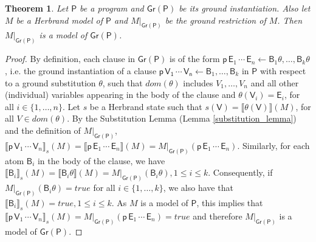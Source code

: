 \documentclass[submission,copyright]{eptcs}
\newtheorem{theorem}{Theorem}
\theoremstyle{definition}
\newcommand{\mwrt}[2]{\llbracket#1\rrbracket(#2)}
\newcommand{\mwrs}[3]{\llbracket#1\rrbracket_{#3}(#2)}
\begin{document}
\begin{theorem}
\label{th_ground_model}
Let $\mathsf{P}$ be a program and $\mathsf{Gr(P)}$ be its ground instantiation.
Also let $M$ be a Herbrand model of $\mathsf{P}$ and $M|_{\mathsf{Gr(P)}}$ be the ground restriction of $M$. Then $M|_\mathsf{Gr(P)}$ is a model of $\mathsf{Gr(P)}$.
\end{theorem}
\begin{proof}
By definition, each clause in $\mathsf{Gr(P)}$ is of the form
$\mathsf{p} \, \mathsf{E}_1 \, \cdots \, \mathsf{E}_n \leftarrow \mathsf{B}_1\theta, \ldots, \mathsf{B}_k\theta$, i.e. the ground instantiation of a clause $\mathsf{p \, V_1 \, \cdots \, V_n} \leftarrow \mathsf{B}_1, \ldots, \mathsf{B}_k$ in $\mathsf{P}$ with respect to a ground substitution $\theta$, such that $dom(\theta)$ includes $V_1,\ldots,V_n$ and all other (individual) variables appearing in the body of the clause and $\theta(\mathsf{V}_i) = \mathsf{E}_i$, for all $i \in \{1, \ldots, n\}$.
Let $s$ be a Herbrand state such that $s(\mathsf{V}) =\mwrt{\theta(\mathsf{V})}{M}$,
for all $V \in dom(\theta)$. By the Substitution Lemma (Lemma \ref{substitution_lemma})
and the definition of $M|_\mathsf{Gr(P)}$,
$\mwrs{\mathsf{p}\, \mathsf{V}_1\, \cdots\, \mathsf{V}_n}{M}{s} =
 \mwrt{\mathsf{p}\, \mathsf{E}_1\, \cdots\, \mathsf{E}_n}{M} =
 M|_\mathsf{Gr(P)}(\mathsf{p}\, \mathsf{E}_1\, \cdots\, \mathsf{E}_n)$.
Similarly, for each atom $\mathsf{B}_i$ in the body of the clause,
we have $\mwrs{\mathsf{B}_i}{M}{s} = \mwrt{\mathsf{B}_i\theta}{M}
= M|_\mathsf{Gr(P)}(\mathsf{B}_i\theta), 1\leq i\leq k$.
Consequently, if $M|_\mathsf{Gr(P)}(\mathsf{B}_i\theta)=true$ for all $i\in\{1,\ldots,k\}$, we also have that $\mwrs{\mathsf{B}_i}{M}{s}=true, 1\leq i\leq k$.
As $M$ is a model of $\mathsf{P}$, this implies that
$\mwrs{\mathsf{p}\, \mathsf{V}_1\, \cdots\, \mathsf{V}_n}{M}{s}=
M|_\mathsf{Gr(P)}(\mathsf{p}\, \mathsf{E}_1\, \cdots\, \mathsf{E}_n)=true$ and
therefore $M|_\mathsf{Gr(P)}$ is a model of $\mathsf{Gr(P)}$.
\end{proof}
\end{document}
